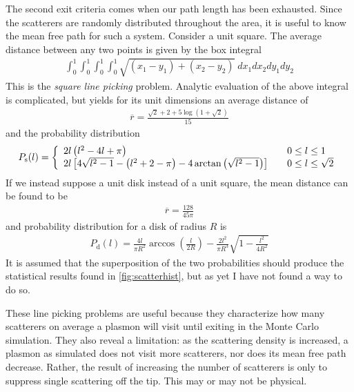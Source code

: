 The second exit criteria comes when our path length has been exhausted.
Since the scatterers are randomly distributed throughout the area, it is
useful to know the mean free path for such a system.  Consider a unit
square.  The average distance between any two points is given by the box
integral
\begin{align}
  \int_0^1 \int_0^1 \int_0^1 \int_0^1 \sqrt{(x_1-y_1)+(x_2-y_2)}\; dx_1 dx_2 dy_1 dy_2
\end{align}
This is the {\it square line picking} problem.  Analytic evaluation of the
above integral is complicated, but yields for its unit dimensions an
average distance of
\begin{align}
  \overline{r} = \frac{\sqrt{2}+2+5\log\left(1+\sqrt{2}\right)}{15}
\end{align}
and the probability distribution
\begin{align}
  P_\mathrm{s}(l) = \left\{
  \begin{array}{l l}
    2l\left(l^2 -4l + \pi\right) & \quad  0\leq l \leq 1        \\
    2l\left[4\sqrt{l^2-1}-\left(l^2+2-\pi\right)-4\arctan\left({\sqrt{l^2-1}}\right)\right]
                                 & \quad 0 \leq l \leq \sqrt{2} \\
  \end{array}
  \right.
\end{align}
If we instead suppose a unit disk instead of a unit square, the mean
distance can be found to be
\begin{align}
  \overline{r}= \frac{128}{45 \pi}
\end{align}
and probability distribution for a disk of radius $R$ is
\begin{align}
  P_\mathrm{d}(l)=\frac{4l}{\pi R^2} \arccos\left(\frac{l}{2R}\right) - \frac{2
    l^2}{\pi R^3} \sqrt{1-\frac{l^2}{4 R^2}}
\end{align}
It is assumed that the superposition of the two probabilities should
produce the statistical results found in \ref{fig:scatterhist}, but as yet
I have not found a way to do so.

These line picking problems are useful because they characterize how many
scatterers on average a plasmon will visit until exiting in the Monte Carlo
simulation.  They also reveal a limitation: as the scattering density is
increased, a plasmon as simulated does not visit more scatterers, nor does
its mean free path decrease.  Rather, the result of increasing the number
of scatterers is only to suppress single scattering off the tip.  This may
or may not be physical.
